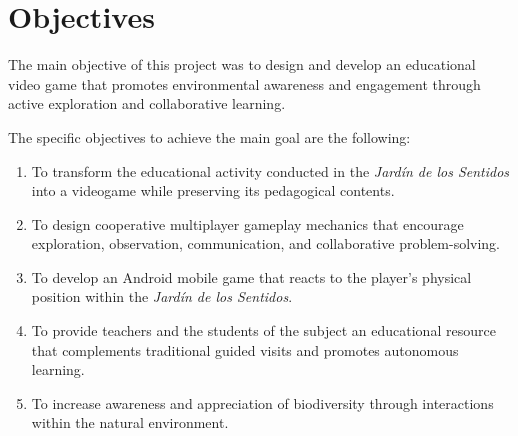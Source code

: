 \section{Objectives}

The main objective of this project was to design and develop an educational video game that promotes environmental awareness and engagement through active exploration and collaborative learning.

The specific objectives to achieve the main goal are the following:
\begin{enumerate}
    \item To transform the educational activity conducted in the \textit{Jardín de los Sentidos} into a videogame while preserving its pedagogical contents.
    \item To design cooperative multiplayer gameplay mechanics that encourage exploration, observation, communication, and collaborative problem-solving.
    \item To develop an Android mobile game that reacts to the player's physical position within the \textit{Jardín de los Sentidos}.
    \item To provide teachers and the students of the subject an educational resource that complements traditional guided visits and promotes autonomous learning.
    \item To increase awareness and appreciation of biodiversity through interactions within the natural environment.
\end{enumerate}

